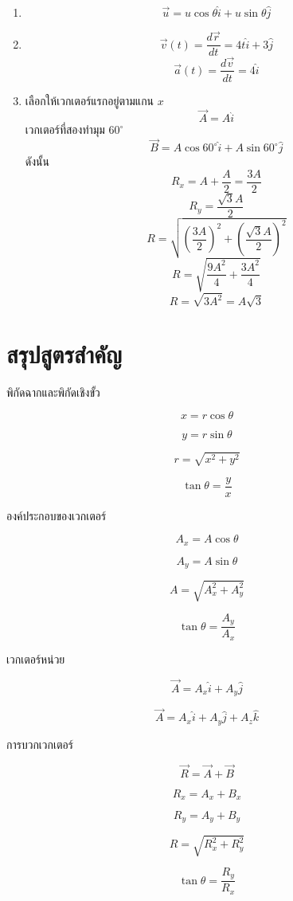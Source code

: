 \documentclass[12pt,a4paper]{report}
\begin{document}
\begin{enumerate}
    \item
    \[
    \vec{u}=u\cos\theta\hat{i}+u\sin\theta\hat{j}
    \]
    
    \item
    \[
    \vec{v}(t)=\frac{d\vec{r}}{dt}=4t\hat{i}+3\hat{j}
    \]
    \[
    \vec{a}(t)=\frac{d\vec{v}}{dt}=4\hat{i}
    \]
    
    \item
    เลือกให้เวกเตอร์แรกอยู่ตามแกน $x$
    \[
    \vec{A}=A\hat{i}
    \]
    เวกเตอร์ที่สองทำมุม $60^\circ$
    \[
    \vec{B}=A\cos60^\circ\hat{i}+A\sin60^\circ\hat{j}
    \]
    ดังนั้น
    \[
    R_x=A+\frac{A}{2}=\frac{3A}{2}
    \]
    \[
    R_y=\frac{\sqrt{3}A}{2}
    \]
    \[
    R=\sqrt{\left(\frac{3A}{2}\right)^2+\left(\frac{\sqrt{3}A}{2}\right)^2}
    \]
    \[
    R=\sqrt{\frac{9A^2}{4}+\frac{3A^2}{4}}
    \]
    \[
    R=\sqrt{3A^2}=A\sqrt{3}
    \]
\end{enumerate}

\section{สรุปสูตรสำคัญ}

\begin{tcolorbox}[title=สรุปบทที่ 3: เวกเตอร์]
พิกัดฉากและพิกัดเชิงขั้ว

\[
x=r\cos\theta
\]

\[
y=r\sin\theta
\]

\[
r=\sqrt{x^2+y^2}
\]

\[
\tan\theta=\frac{y}{x}
\]

องค์ประกอบของเวกเตอร์

\[
A_x=A\cos\theta
\]

\[
A_y=A\sin\theta
\]

\[
A=\sqrt{A_x^2+A_y^2}
\]

\[
\tan\theta=\frac{A_y}{A_x}
\]

เวกเตอร์หน่วย

\[
\vec{A}=A_x\hat{i}+A_y\hat{j}
\]

\[
\vec{A}=A_x\hat{i}+A_y\hat{j}+A_z\hat{k}
\]

การบวกเวกเตอร์

\[
\vec{R}=\vec{A}+\vec{B}
\]

\[
R_x=A_x+B_x
\]

\[
R_y=A_y+B_y
\]

\[
R=\sqrt{R_x^2+R_y^2}
\]

\[
\tan\theta=\frac{R_y}{R_x}
\]
\end{tcolorbox}
\end{document}
